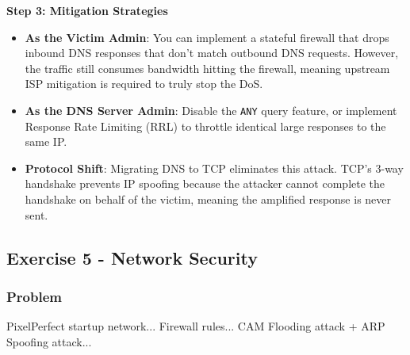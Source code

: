 \documentclass{article}
\begin{document}
\textbf{Step 3: Mitigation Strategies}
\begin{itemize}
    \item \textbf{As the Victim Admin}: You can implement a stateful firewall that drops inbound DNS responses that don't match outbound DNS requests. However, the traffic still consumes bandwidth hitting the firewall, meaning upstream ISP mitigation is required to truly stop the DoS.
    \item \textbf{As the DNS Server Admin}: Disable the \texttt{ANY} query feature, or implement Response Rate Limiting (RRL) to throttle identical large responses to the same IP.
    \item \textbf{Protocol Shift}: Migrating DNS to TCP eliminates this attack. TCP's 3-way handshake prevents IP spoofing because the attacker cannot complete the handshake on behalf of the victim, meaning the amplified response is never sent.
\end{itemize}

\subsection{Exercise 5 - Network Security}
\subsubsection*{Problem}
PixelPerfect startup network... Firewall rules... CAM Flooding attack + ARP Spoofing attack...
\end{document}
